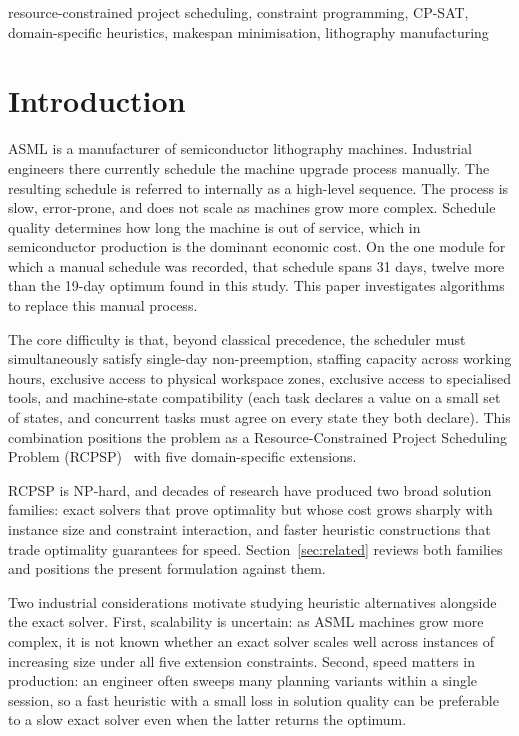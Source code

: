 \documentclass[conference]{IEEEtran}
\begin{document}
\begin{IEEEkeywords}
resource-constrained project scheduling, constraint programming,
CP-SAT, domain-specific heuristics, makespan minimisation,
lithography manufacturing
\end{IEEEkeywords}

\section{Introduction}

ASML is a manufacturer of semiconductor lithography machines.
Industrial engineers there currently schedule the machine upgrade
process manually. The resulting schedule is referred to internally as
a high-level sequence. The process is slow, error-prone, and does not
scale as machines grow more complex. Schedule quality determines how
long the machine is out of service, which in semiconductor production
is the dominant economic cost. On the one module for which a manual
schedule was recorded, that schedule spans 31 days, twelve more than
the 19-day optimum found in this study. This paper investigates
algorithms to replace this manual process.

The core difficulty is that, beyond classical precedence, the
scheduler must simultaneously satisfy single-day non-preemption,
staffing capacity across working hours, exclusive access to physical
workspace zones, exclusive access to specialised tools, and
machine-state compatibility (each task declares a value on a small set
of states, and concurrent tasks must agree on every state they both
declare). This combination positions the problem as a
Resource-Constrained Project Scheduling Problem
(RCPSP)~\cite{brucker1999rcpsp} with five domain-specific extensions.

RCPSP is NP-hard, and decades of research have produced two broad
solution families: exact solvers that prove optimality but whose cost
grows sharply with instance size and constraint interaction, and
faster heuristic constructions that trade optimality guarantees for
speed. Section~\ref{sec:related} reviews both families and positions
the present formulation against them.

Two industrial considerations motivate studying heuristic alternatives
alongside the exact solver. First, scalability is uncertain: as ASML
machines grow more complex, it is not known whether an exact solver
scales well across instances of increasing size under all five
extension constraints. Second, speed matters in production: an engineer
often sweeps many planning variants within a single session, so a fast
heuristic with a small loss in solution quality can be preferable to a
slow exact solver even when the latter returns the optimum.
\end{document}
